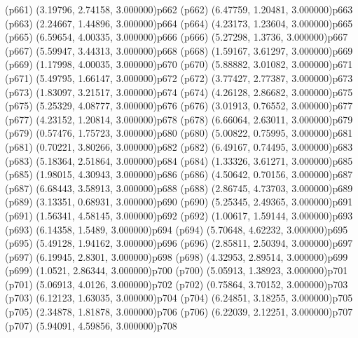 \psdot(p661)
\psPoint(3.19796, 2.74158, 3.000000){p662}
\psdot(p662)
\psPoint(6.47759, 1.20481, 3.000000){p663}
\psdot(p663)
\psPoint(2.24667, 1.44896, 3.000000){p664}
\psdot(p664)
\psPoint(4.23173, 1.23604, 3.000000){p665}
\psdot(p665)
\psPoint(6.59654, 4.00335, 3.000000){p666}
\psdot(p666)
\psPoint(5.27298, 1.3736, 3.000000){p667}
\psdot(p667)
\psPoint(5.59947, 3.44313, 3.000000){p668}
\psdot(p668)
\psPoint(1.59167, 3.61297, 3.000000){p669}
\psdot(p669)
\psPoint(1.17998, 4.00035, 3.000000){p670}
\psdot(p670)
\psPoint(5.88882, 3.01082, 3.000000){p671}
\psdot(p671)
\psPoint(5.49795, 1.66147, 3.000000){p672}
\psdot(p672)
\psPoint(3.77427, 2.77387, 3.000000){p673}
\psdot(p673)
\psPoint(1.83097, 3.21517, 3.000000){p674}
\psdot(p674)
\psPoint(4.26128, 2.86682, 3.000000){p675}
\psdot(p675)
\psPoint(5.25329, 4.08777, 3.000000){p676}
\psdot(p676)
\psPoint(3.01913, 0.76552, 3.000000){p677}
\psdot(p677)
\psPoint(4.23152, 1.20814, 3.000000){p678}
\psdot(p678)
\psPoint(6.66064, 2.63011, 3.000000){p679}
\psdot(p679)
\psPoint(0.57476, 1.75723, 3.000000){p680}
\psdot(p680)
\psPoint(5.00822, 0.75995, 3.000000){p681}
\psdot(p681)
\psPoint(0.70221, 3.80266, 3.000000){p682}
\psdot(p682)
\psPoint(6.49167, 0.74495, 3.000000){p683}
\psdot(p683)
\psPoint(5.18364, 2.51864, 3.000000){p684}
\psdot(p684)
\psPoint(1.33326, 3.61271, 3.000000){p685}
\psdot(p685)
\psPoint(1.98015, 4.30943, 3.000000){p686}
\psdot(p686)
\psPoint(4.50642, 0.70156, 3.000000){p687}
\psdot(p687)
\psPoint(6.68443, 3.58913, 3.000000){p688}
\psdot(p688)
\psPoint(2.86745, 4.73703, 3.000000){p689}
\psdot(p689)
\psPoint(3.13351, 0.68931, 3.000000){p690}
\psdot(p690)
\psPoint(5.25345, 2.49365, 3.000000){p691}
\psdot(p691)
\psPoint(1.56341, 4.58145, 3.000000){p692}
\psdot(p692)
\psPoint(1.00617, 1.59144, 3.000000){p693}
\psdot(p693)
\psPoint(6.14358, 1.5489, 3.000000){p694}
\psdot(p694)
\psPoint(5.70648, 4.62232, 3.000000){p695}
\psdot(p695)
\psPoint(5.49128, 1.94162, 3.000000){p696}
\psdot(p696)
\psPoint(2.85811, 2.50394, 3.000000){p697}
\psdot(p697)
\psPoint(6.19945, 2.8301, 3.000000){p698}
\psdot(p698)
\psPoint(4.32953, 2.89514, 3.000000){p699}
\psdot(p699)
\psPoint(1.0521, 2.86344, 3.000000){p700}
\psdot(p700)
\psPoint(5.05913, 1.38923, 3.000000){p701}
\psdot(p701)
\psPoint(5.06913, 4.0126, 3.000000){p702}
\psdot(p702)
\psPoint(0.75864, 3.70152, 3.000000){p703}
\psdot(p703)
\psPoint(6.12123, 1.63035, 3.000000){p704}
\psdot(p704)
\psPoint(6.24851, 3.18255, 3.000000){p705}
\psdot(p705)
\psPoint(2.34878, 1.81878, 3.000000){p706}
\psdot(p706)
\psPoint(6.22039, 2.12251, 3.000000){p707}
\psdot(p707)
\psPoint(5.94091, 4.59856, 3.000000){p708}
